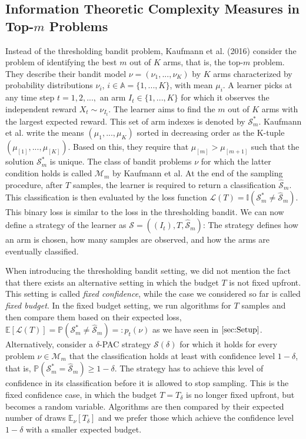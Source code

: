 \documentclass[11pt,]{article}
\begin{document}
\subsection{\texorpdfstring{Information Theoretic Complexity Measures in
Top-\(m\) Problems
\label{sec:KaufmannEtAl2016}}{Information Theoretic Complexity Measures in Top-m Problems }}\label{information-theoretic-complexity-measures-in-top-m-problems}

Instead of the thresholding bandit problem, Kaufmann et al. (2016)
consider the problem of identifying the best \(m\) out of \(K\) arms,
that is, the top-\(m\) problem. They describe their bandit model
\(\nu = (\nu_1,...,\nu_K)\) by \(K\) arms characterized by probability
distributions \(\nu_i\), \(i \in \mathbb{A} = \{1,...,K\}\), with mean
\(\mu_i\). A learner picks at any time step \(t=1,2,...,\) an arm
\(I_t \in \{1,...,K\}\) for which it observes the independent reward
\(X_{t} \sim \nu_{I_t}\). The learner aims to find the \(m\) out of
\(K\) arms with the largest expected reward. This set of arm indexes is
denoted by \(\mathcal{S}_m^*\). Kaufmann et al. write the means
\((\mu_{1}, ..., \mu_{K})\) sorted in decreasing order as the K-tuple
\((\mu_{[1]}, ..., \mu_{[K]})\). Based on this, they require that
\(\mu_{[m]} > \mu_{[m+1]}\) such that the solution \(\mathcal{S}_m^*\)
is unique. The class of bandit problems \(\nu\) for which the latter
condition holds is called \(\mathcal{M}_m\) by Kaufmann et al. At the
end of the sampling procedure, after \(T\) samples, the learner is
required to return a classification \(\hat{\mathcal{S}}_m\). This
classification is then evaluated by the loss function
\(\mathcal{L}(T) = \mathbb{I}(\mathcal{S}^*_m \neq \hat{\mathcal{S}}_m)\).
This binary loss is similar to the loss in the thresholding bandit. We
can now define a strategy of the learner as
\(\mathcal{S} = ((I_t), T, \hat{\mathcal{S}}_m)\): The strategy defines
how an arm is chosen, how many samples are observed, and how the arms
are eventually classified.

When introducing the thresholding bandit setting, we did not mention the
fact that there exists an alternative setting in which the budget \(T\)
is not fixed upfront. This setting is called \emph{fixed confidence},
while the case we considered so far is called \emph{fixed budget}. In
the fixed budget setting, we run algorithms for \(T\) samples and then
compare them based on their expected loss,
\(\mathbb{E}[\mathcal{L}(T)] = \mathbb{P}(\mathcal{S}^*_m \neq \hat{\mathcal{S}}_m) =: p_t(\nu)\)
as we have seen in \(\autoref{sec:Setup}\). Alternatively, consider a
\(\delta\)-PAC strategy \(\mathcal{S}(\delta)\) for which it holds for
every problem \(\nu \in \mathcal{M}_m\) that the classification holds at
least with confidence level \(1-\delta\), that is,
\(\mathbb{P}(\mathcal{S}^*_m = \hat{\mathcal{S}}_m) \geq 1-\delta\). The
strategy has to achieve this level of confidence in its classification
before it is allowed to stop sampling. This is the fixed confidence
case, in which the budget \(T=T_{\delta}\) is no longer fixed upfront,
but becomes a random variable. Algorithms are then compared by their
expected number of draws \(\mathbb{E}_{\nu}[T_{\delta}]\) and we prefer
those which achieve the confidence level \(1-\delta\) with a smaller
expected budget.
\end{document}
